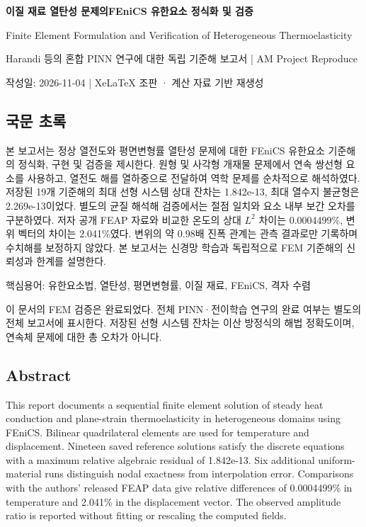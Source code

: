 \documentclass[10pt,a4paper]{article}
\begin{document}
{\LARGE\bfseries\sffamily\color{ink} 이질 재료 열탄성 문제의\newline FEniCS 유한요소 정식화 및 검증\par}\vspace{5mm}

{\small\color{muted} Finite Element Formulation and Verification of Heterogeneous Thermoelasticity\par}

{\small\color{muted} Harandi 등의 혼합 PINN 연구에 대한 독립 기준해 보고서 | AM Project Reproduce\par}

{\small\color{muted} 작성일: 2026-11-04 | XeLaTeX 조판 · 계산 자료 기반 재생성\par}

\subsection{국문 초록}

본 보고서는 정상 열전도와 평면변형률 열탄성 문제에 대한 FEniCS 유한요소 기준해의 정식화, 구현 및 검증을 제시한다. 원형 및 사각형 개재물 문제에서 연속 쌍선형 요소를 사용하고, 열전도 해를 열하중으로 전달하여 역학 문제를 순차적으로 해석하였다. 저장된 19개 기준해의 최대 선형 시스템 상대 잔차는 1.842e-13, 최대 열수지 불균형은 2.269e-13이었다. 별도의 균질 해석해 검증에서는 절점 일치와 요소 내부 보간 오차를 구분하였다. 저자 공개 FEAP 자료와 비교한 온도의 상대 $L^2$ 차이는 0.0004499\%, 변위 벡터의 차이는 2.041\%였다. 변위의 약 0.98배 진폭 관계는 관측 결과로만 기록하며 수치해를 보정하지 않았다. 본 보고서는 신경망 학습과 독립적으로 FEM 기준해의 신뢰성과 한계를 설명한다.\par

{\small\color{muted} 핵심용어: 유한요소법, 열탄성, 평면변형률, 이질 재료, FEniCS, 격자 수렴\par}

이 문서의 FEM 검증은 완료되었다. 전체 PINN·전이학습 연구의 완료 여부는 별도의 전체 보고서에 표시한다. 저장된 선형 시스템 잔차는 이산 방정식의 해법 정확도이며, 연속체 문제에 대한 총 오차가 아니다.\par

\clearpage

\subsection{Abstract}

This report documents a sequential finite element solution of steady heat conduction and plane-strain thermoelasticity in heterogeneous domains using FEniCS. Bilinear quadrilateral elements are used for temperature and displacement. Nineteen saved reference solutions satisfy the discrete equations with a maximum relative algebraic residual of 1.842e-13. Six additional uniform-material runs distinguish nodal exactness from interpolation error. Comparisons with the authors' released FEAP data give relative differences of 0.0004499\% in temperature and 2.041\% in the displacement vector. The observed amplitude ratio is reported without fitting or rescaling the computed fields.\par
\end{document}

